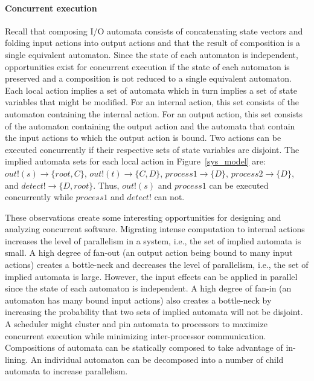 \paragraph*{Concurrent execution}
Recall that composing I/O automata consists of concatenating state vectors and folding input actions into output actions and that the result of composition is a single equivalent automaton.
Since the state of each automaton is independent, opportunities exist for concurrent execution if the state of each automaton is preserved and a composition is not reduced to a single equivalent automaton.
Each local action implies a set of automata which in turn implies a set of state variables that might be modified.
For an internal action, this set consists of the automaton containing the internal action.
For an output action, this set consists of the automaton containing the output action and the automata that contain the input actions to which the output action is bound.
Two actions can be executed concurrently if their respective sets of state variables are disjoint.
The implied automata sets for each local action in Figure~\ref{sys_model} are: $out!(s) \to \{root, C\}$, $out!(t) \to \{C, D\}$, $process1 \to \{D\}$, $process2 \to \{D\}$, and $detect! \to \{D, root\}$.
Thus, $out!(s)$ and $process1$ can be executed concurrently while $process1$ and $detect!$ can not.

\ifjournal
These observations create some interesting opportunities for designing and analyzing concurrent software.
Migrating intense computation to internal actions increases the level of parallelism in a system, i.e., the set of implied automata is small.
A high degree of fan-out (an output action being bound to many input actions) creates a bottle-neck and decreases the level of parallelism, i.e., the set of implied automata is large.
However, the input effects can be applied in parallel since the state of each automaton is independent.
A high degree of fan-in (an automaton has many bound input actions) also creates a bottle-neck by increasing the probability that two sets of implied automata will not be disjoint.
A scheduler might cluster and pin automata to processors to maximize concurrent execution while minimizing inter-processor communication.
Compositions of automata can be statically composed to take advantage of in-lining.
An individual automaton can be decomposed into a number of child automata to increase parallelism.

